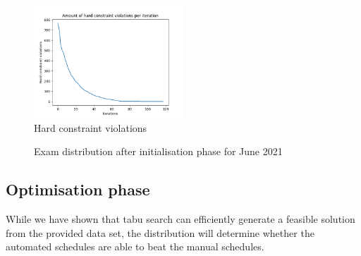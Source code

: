 \begin{figure}[h]
	\centering
	\includegraphics[width=0.5\textwidth]{images/init/conflicts.png} 
	\caption{Hard constraint violations}
	\label{fig:violations}
\end{figure}

\begin{figure}[h]
  \centering
  \hfill
  \caption{Exam distribution after initialisation phase for June 2021}
  \label{fig:init}
\end{figure}

\subsection{Optimisation phase}

While we have shown that tabu search can efficiently generate a feasible solution from the provided data set, the distribution will determine whether the automated schedules are able to beat the manual schedules. 

